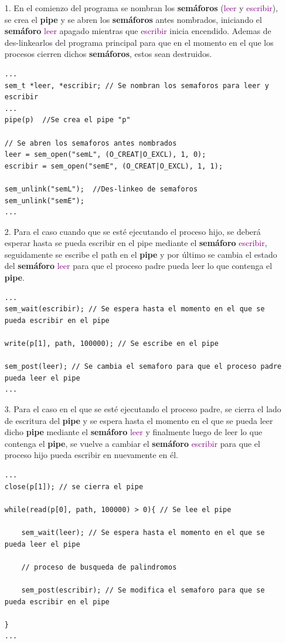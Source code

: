 \documentclass[12pt,letterpaper]{article}
\begin{document}
\begin{enumerate}
  \item[1.] En el comienzo del programa se nombran los \textbf{semáforos} (\textcolor{purple}{leer} y \textcolor{purple}{escribir}), se crea el \textbf{pipe} y se abren los \textbf{semáforos} antes nombrados, iniciando el \textbf{semáforo} \textcolor{purple}{leer} apagado mientras que \textcolor{purple}{escribir} inicia encendido. Ademas de des-linkearlos del programa principal para que en el momento en el que los procesos cierren dichos \textbf{semáforos}, estos sean destruidos.
\begin{lstlisting}[style=C]
...
sem_t *leer, *escribir; // Se nombran los semaforos para leer y escribir
...
pipe(p)  //Se crea el pipe "p"

// Se abren los semaforos antes nombrados 
leer = sem_open("semL", (O_CREAT|O_EXCL), 1, 0);
escribir = sem_open("semE", (O_CREAT|O_EXCL), 1, 1);

sem_unlink("semL");  //Des-linkeo de semaforos 
sem_unlink("semE");
...
\end{lstlisting}

  \item[2.] Para el caso cuando que se esté ejecutando el proceso hijo, se deberá esperar hasta se pueda escribir en el pipe mediante el \textbf{semáforo} \textcolor{purple}{escribir}, seguidamente se escribe el path en el \textbf{pipe} y por último se cambia el estado del \textbf{semáforo}  \textcolor{purple}{leer} para que el proceso padre pueda leer lo que contenga el \textbf{pipe}.

\clearpage

\begin{lstlisting}[style=C]
...
sem_wait(escribir); // Se espera hasta el momento en el que se pueda escribir en el pipe

write(p[1], path, 100000); // Se escribe en el pipe

sem_post(leer); // Se cambia el semaforo para que el proceso padre pueda leer el pipe
...
\end{lstlisting}

  \item[3.] Para el caso en el que se esté ejecutando el proceso padre, se cierra el lado de escritura del \textbf{pipe} y se espera hasta el momento en el que se pueda leer dicho \textbf{pipe} mediante el \textbf{semáforo} \textcolor{purple}{leer} y finalmente luego de leer lo que contenga el \textbf{pipe}, se vuelve a cambiar el \textbf{semáforo} \textcolor{purple}{escribir} para que el proceso hijo pueda escribir en nuevamente en él.
\begin{lstlisting}[style=C]
...
close(p[1]); // se cierra el pipe

while(read(p[0], path, 100000) > 0){ // Se lee el pipe
	
	sem_wait(leer); // Se espera hasta el momento en el que se pueda leer el pipe

	// proceso de busqueda de palindromos
	
    sem_post(escribir); // Se modifica el semaforo para que se pueda escribir en el pipe

}
...
\end{lstlisting}
\end{enumerate}
\end{document}

